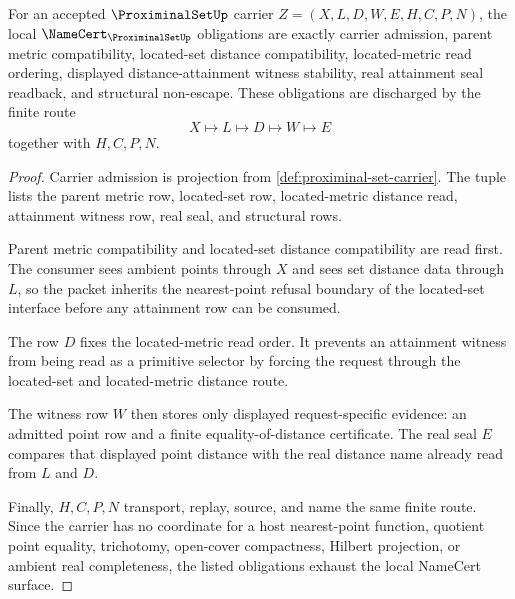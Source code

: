 \begin{theorem}
\label{thm:proximinal-set-namecert-obligations}
For an accepted $\ProximinalSetUp$ carrier $Z=(X,L,D,W,E,H,C,P,N)$, the local $\NameCert_{\ProximinalSetUp}$ obligations are exactly carrier admission, parent metric compatibility, located-set distance compatibility, located-metric read ordering, displayed distance-attainment witness stability, real attainment seal readback, and structural non-escape. These obligations are discharged by the finite route
$$
X\longmapsto L\longmapsto D\longmapsto W\longmapsto E
$$
together with $H,C,P,N$.
\end{theorem}
\begin{proof}
Carrier admission is projection from \autoref{def:proximinal-set-carrier}. The tuple lists the parent metric row, located-set row, located-metric distance read, attainment witness row, real seal, and structural rows.

Parent metric compatibility and located-set distance compatibility are read first. The consumer sees ambient points through $X$ and sees set distance data through $L$, so the packet inherits the nearest-point refusal boundary of the located-set interface before any attainment row can be consumed.

The row $D$ fixes the located-metric read order. It prevents an attainment witness from being read as a primitive selector by forcing the request through the located-set and located-metric distance route.

The witness row $W$ then stores only displayed request-specific evidence: an admitted point row and a finite equality-of-distance certificate. The real seal $E$ compares that displayed point distance with the real distance name already read from $L$ and $D$.

Finally, $H,C,P,N$ transport, replay, source, and name the same finite route. Since the carrier has no coordinate for a host nearest-point function, quotient point equality, trichotomy, open-cover compactness, Hilbert projection, or ambient real completeness, the listed obligations exhaust the local NameCert surface.
\end{proof}

